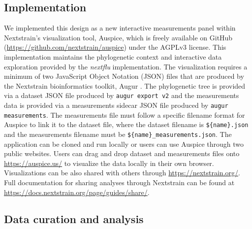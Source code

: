 \documentclass[utf8]{FrontiersinHarvard} %
\begin{document}
\subsection{Implementation}

We implemented this design as a new interactive measurements panel within Nextstrain's visualization tool, Auspice, which is freely available on GitHub (\url{https://github.com/nextstrain/auspice}) under the AGPLv3 license.
This implementation maintains the phylogenetic context and interactive data exploration provided by the \emph{nextflu} implementation.
The visualization requires a minimum of two JavaScript Object Notation (JSON) files that are produced by the Nextstrain bioinformatics toolkit, Augur \citep{Huddleston2021}.
The phylogenetic tree is provided via a dataset JSON file produced by \texttt{augur export v2} and the measurements data is provided via a measurements sidecar JSON file produced by \texttt{augur measurements}.
The measurements file must follow a specific filename format for Auspice to link it to the dataset file, where the dataset filename is \texttt{\$\{name\}.json} and the measurements filename must be \texttt{\$\{name\}\_measurements.json}.
The application can be cloned and run locally or users can use Auspice through two public websites.
Users can drag and drop dataset and measurements files onto \url{https://auspice.us/} to visualize the data locally in their own browser.
Visualizations can be also shared with others through \url{https://nextstrain.org/}.
Full documentation for sharing analyses through Nextstrain can be found at \url{https://docs.nextstrain.org/page/guides/share/}.

\subsection{Data curation and analysis}
\end{document}
